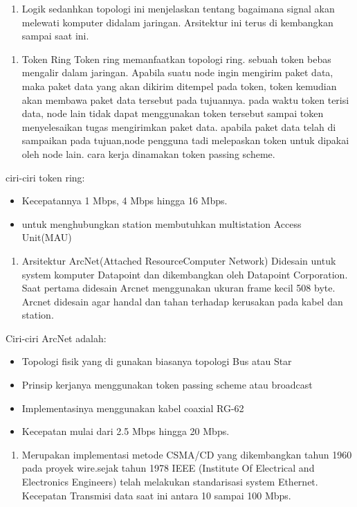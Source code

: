 \begin{enumerate}
  \item Logik
        sedanhkan topologi ini menjelaskan tentang bagaimana signal akan melewati komputer didalam jaringan. Arsitektur ini terus di kembangkan sampai saat ini.
\end{enumerate}

\begin{enumerate}
  \item  Token Ring
         Token ring memanfaatkan topologi ring. sebuah token bebas mengalir dalam jaringan. Apabila suatu node ingin mengirim paket data, maka paket data yang akan dikirim ditempel pada token, token kemudian akan membawa paket data tersebut pada tujuannya. pada waktu token terisi data, node lain tidak dapat menggunakan token tersebut sampai token menyelesaikan tugas mengirimkan paket data. apabila paket data telah di sampaikan pada tujuan,node pengguna tadi melepaskan token untuk dipakai oleh node lain. cara kerja dinamakan token passing scheme.
\end{enumerate}
ciri-ciri token ring:
\begin{itemize}
  \item Kecepatannya 1 Mbps, 4 Mbps hingga 16 Mbps.
  \item untuk menghubungkan station membutuhkan multistation Access Unit(MAU)
\end{itemize}

\begin{enumerate}
  \item Arsitektur ArcNet(Attached ResourceComputer Network)
        Didesain untuk system komputer Datapoint dan dikembangkan oleh Datapoint Corporation. Saat pertama didesain Arcnet menggunakan ukuran frame kecil 508 byte. Arcnet didesain agar handal dan tahan terhadap kerusakan pada kabel dan station.
\end{enumerate}
Ciri-ciri ArcNet adalah:
\begin{itemize}
  \item Topologi fisik yang di gunakan biasanya topologi Bus atau Star
  \item Prinsip kerjanya menggunakan token passing scheme atau broadcast
  \item Implementasinya menggunakan kabel coaxial RG-62
  \item Kecepatan mulai dari 2.5 Mbps hingga 20 Mbps.
\end{itemize}

\begin{enumerate}
  \item Merupakan implementasi metode CSMA/CD yang dikembangkan
        tahun 1960 pada proyek wire.sejak tahun 1978 IEEE (Institute Of Electrical and Electronics Engineers) telah melakukan
        standarisasi system Ethernet. Kecepatan Transmisi data saat ini antara 10 sampai 100 Mbps.
\end{enumerate}

